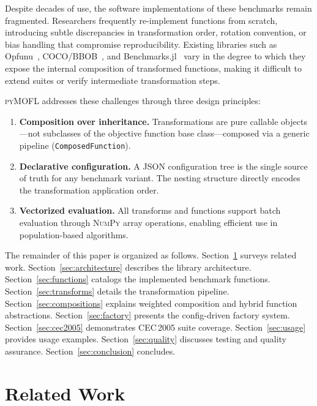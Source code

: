 \documentclass[11pt,a4paper]{article}
\newcommand{\pymofl}{\textsc{pyMOFL}}
\newcommand{\numpy}{\textsc{NumPy}}
\begin{document}
Despite decades of use, the software implementations of these benchmarks remain
fragmented. Researchers frequently re-implement functions from scratch,
introducing subtle discrepancies in transformation order, rotation convention,
or bias handling that compromise reproducibility. Existing libraries such as
Opfunu~\citep{VanThieu2024}, COCO/BBOB~\citep{Hansen2021}, and
Benchmarks.jl~\citep{benchmarksjl} vary in the degree to which they expose the
internal composition of transformed functions, making it difficult to extend
suites or verify intermediate transformation steps.

\pymofl{} addresses these challenges through three design principles:

\begin{enumerate}[leftmargin=*,nosep]
  \item \textbf{Composition over inheritance.} Transformations are
    pure callable objects---not subclasses of the objective function base
    class---composed via a generic pipeline (\texttt{ComposedFunction}).
  \item \textbf{Declarative configuration.} A JSON configuration tree is the
    single source of truth for any benchmark variant. The nesting structure
    directly encodes the transformation application order.
  \item \textbf{Vectorized evaluation.} All transforms and functions support
    batch evaluation through \numpy{} array operations, enabling efficient
    use in population-based algorithms.
\end{enumerate}

The remainder of this paper is organized as follows.
Section~\ref{sec:related} surveys related work.
Section~\ref{sec:architecture} describes the library architecture.
Section~\ref{sec:functions} catalogs the implemented benchmark functions.
Section~\ref{sec:transforms} details the transformation pipeline.
Section~\ref{sec:compositions} explains weighted composition and hybrid function
abstractions.
Section~\ref{sec:factory} presents the config-driven factory system.
Section~\ref{sec:cec2005} demonstrates CEC\,2005 suite coverage.
Section~\ref{sec:usage} provides usage examples.
Section~\ref{sec:quality} discusses testing and quality assurance.
Section~\ref{sec:conclusion} concludes.

\section{Related Work}\label{sec:related}
\end{document}
